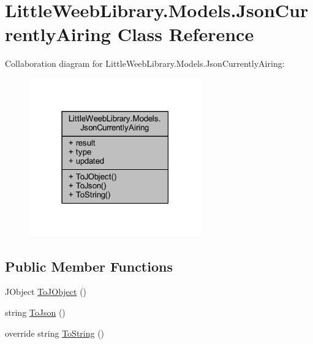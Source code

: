 \hypertarget{class_little_weeb_library_1_1_models_1_1_json_currently_airing}{}\section{Little\+Weeb\+Library.\+Models.\+Json\+Currently\+Airing Class Reference}
\label{class_little_weeb_library_1_1_models_1_1_json_currently_airing}


Collaboration diagram for Little\+Weeb\+Library.\+Models.\+Json\+Currently\+Airing\+:\nopagebreak
\begin{figure}[H]
\begin{center}
\leavevmode
\includegraphics[width=210pt]{class_little_weeb_library_1_1_models_1_1_json_currently_airing__coll__graph}
\end{center}
\end{figure}
\subsection*{Public Member Functions}
\begin{DoxyCompactItemize}
\item 
J\+Object \mbox{\hyperlink{class_little_weeb_library_1_1_models_1_1_json_currently_airing_a17c6ec2452aff297f572ce2544c89370}{To\+J\+Object}} ()
\item 
string \mbox{\hyperlink{class_little_weeb_library_1_1_models_1_1_json_currently_airing_a5e56160f130c25bd439904d14b5bdbc4}{To\+Json}} ()
\item 
override string \mbox{\hyperlink{class_little_weeb_library_1_1_models_1_1_json_currently_airing_a330c337c9e0ddf2866a9a102ae0e9880}{To\+String}} ()
\end{DoxyCompactItemize}
